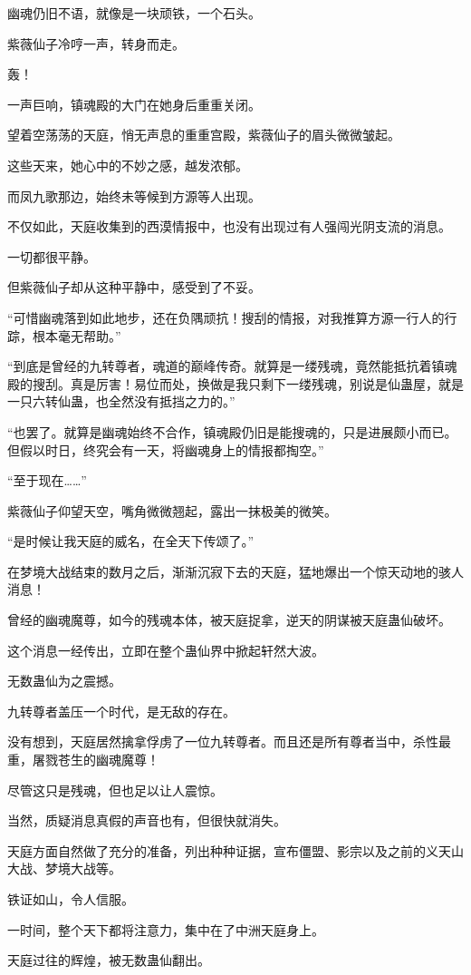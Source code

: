 \begin{this_body}
幽魂仍旧不语，就像是一块顽铁，一个石头。

紫薇仙子冷哼一声，转身而走。

轰！

一声巨响，镇魂殿的大门在她身后重重关闭。

望着空荡荡的天庭，悄无声息的重重宫殿，紫薇仙子的眉头微微皱起。

这些天来，她心中的不妙之感，越发浓郁。

而凤九歌那边，始终未等候到方源等人出现。

不仅如此，天庭收集到的西漠情报中，也没有出现过有人强闯光阴支流的消息。

一切都很平静。

但紫薇仙子却从这种平静中，感受到了不妥。

“可惜幽魂落到如此地步，还在负隅顽抗！搜刮的情报，对我推算方源一行人的行踪，根本毫无帮助。”

“到底是曾经的九转尊者，魂道的巅峰传奇。就算是一缕残魂，竟然能抵抗着镇魂殿的搜刮。真是厉害！易位而处，换做是我只剩下一缕残魂，别说是仙蛊屋，就是一只六转仙蛊，也全然没有抵挡之力的。”

“也罢了。就算是幽魂始终不合作，镇魂殿仍旧是能搜魂的，只是进展颇小而已。但假以时日，终究会有一天，将幽魂身上的情报都掏空。”

“至于现在……”

紫薇仙子仰望天空，嘴角微微翘起，露出一抹极美的微笑。

“是时候让我天庭的威名，在全天下传颂了。”

在梦境大战结束的数月之后，渐渐沉寂下去的天庭，猛地爆出一个惊天动地的骇人消息！

曾经的幽魂魔尊，如今的残魂本体，被天庭捉拿，逆天的阴谋被天庭蛊仙破坏。

这个消息一经传出，立即在整个蛊仙界中掀起轩然大波。

无数蛊仙为之震撼。

九转尊者盖压一个时代，是无敌的存在。

没有想到，天庭居然擒拿俘虏了一位九转尊者。而且还是所有尊者当中，杀性最重，屠戮苍生的幽魂魔尊！

尽管这只是残魂，但也足以让人震惊。

当然，质疑消息真假的声音也有，但很快就消失。

天庭方面自然做了充分的准备，列出种种证据，宣布僵盟、影宗以及之前的义天山大战、梦境大战等。

铁证如山，令人信服。

一时间，整个天下都将注意力，集中在了中洲天庭身上。

天庭过往的辉煌，被无数蛊仙翻出。


\end{this_body}
